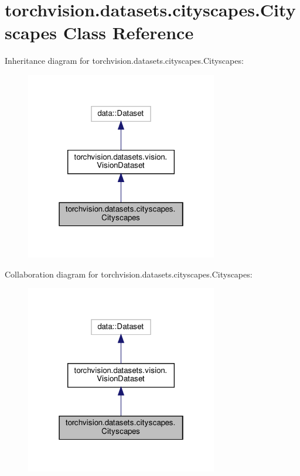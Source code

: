 \hypertarget{classtorchvision_1_1datasets_1_1cityscapes_1_1Cityscapes}{}\section{torchvision.\+datasets.\+cityscapes.\+Cityscapes Class Reference}
\label{classtorchvision_1_1datasets_1_1cityscapes_1_1Cityscapes}


Inheritance diagram for torchvision.\+datasets.\+cityscapes.\+Cityscapes\+:
\nopagebreak
\begin{figure}[H]
\begin{center}
\leavevmode
\includegraphics[width=238pt]{classtorchvision_1_1datasets_1_1cityscapes_1_1Cityscapes__inherit__graph}
\end{center}
\end{figure}


Collaboration diagram for torchvision.\+datasets.\+cityscapes.\+Cityscapes\+:
\nopagebreak
\begin{figure}[H]
\begin{center}
\leavevmode
\includegraphics[width=238pt]{classtorchvision_1_1datasets_1_1cityscapes_1_1Cityscapes__coll__graph}
\end{center}
\end{figure}
